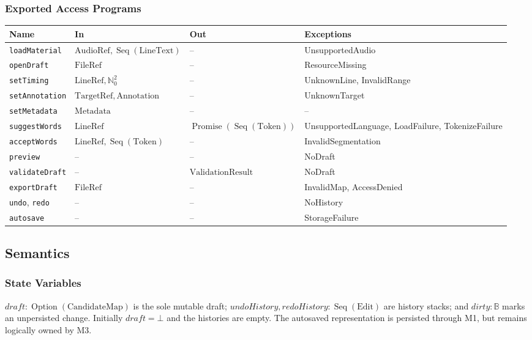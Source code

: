 \documentclass[12pt, titlepage]{article}
\begin{document}
\subsubsection{Exported Access Programs}
\begin{center}
\small
\begin{tabularx}{\textwidth}{@{}p{}p{}p{}X@{}}
\toprule
\textbf{Name} & \textbf{In} & \textbf{Out} & \textbf{Exceptions}\\
\midrule
\texttt{loadMaterial} & $\mathrm{AudioRef},
\operatorname{Seq}(\mathrm{LineText})$ & -- & UnsupportedAudio\\
\texttt{openDraft} & $\mathrm{FileRef}$ & -- & ResourceMissing\\
\texttt{setTiming} & $\mathrm{LineRef},\mathbb{N}_0^2$
& -- & UnknownLine, InvalidRange\\
\texttt{setAnnotation} & $\mathrm{TargetRef},
\mathrm{Annotation}$ & -- & UnknownTarget\\
\texttt{setMetadata} & $\mathrm{Metadata}$ & -- & --\\
\texttt{suggestWords} & $\mathrm{LineRef}$ &
$\operatorname{Promise}(\operatorname{Seq}(\mathrm{Token}))$ &
UnsupportedLanguage, LoadFailure, TokenizeFailure\\
\texttt{acceptWords} & $\mathrm{LineRef},
\operatorname{Seq}(\mathrm{Token})$ & -- & InvalidSegmentation\\
\texttt{preview} & -- & -- & NoDraft\\
\texttt{validateDraft} & -- & $\mathrm{ValidationResult}$ & NoDraft\\
\texttt{exportDraft} & $\mathrm{FileRef}$ & -- & InvalidMap, AccessDenied\\
\texttt{undo}, \texttt{redo} & -- & -- & NoHistory\\
\texttt{autosave} & -- & -- & StorageFailure\\
\bottomrule
\end{tabularx}
\normalsize
\end{center}

\subsection{Semantics}
\subsubsection{State Variables}
$draft:\operatorname{Option}(\mathrm{CandidateMap})$
is the sole mutable draft;
$undoHistory,redoHistory:\operatorname{Seq}(\mathrm{Edit})$
are history stacks; and $dirty:\mathbb{B}$ marks an
unpersisted change. Initially $draft=\bot$ and the histories
are empty. The autosaved representation is persisted through M1,
but remains logically owned by M3.
\end{document}
